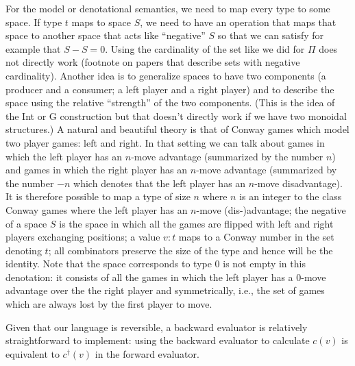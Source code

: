 \documentclass[authoryear,preprint]{sigplanconf}
\begin{document}
For the model or denotational semantics, we need to map every type to some
space. If type $t$ maps to space $S$, we need to have an operation that maps
that space to another space that acts like ``negative'' $S$ so that we can
satisfy for example that $S-S=0$. Using the cardinality of the set like we
did for $\Pi$ does not directly work (footnote on papers that describe sets
with negative cardinality). Another idea is to generalize spaces to have two
components (a producer and a consumer; a left player and a right player) and
to describe the space using the relative ``strength'' of the two
components. (This is the idea of the Int or G construction but that doesn't
directly work if we have two monoidal structures.) A natural and beautiful
theory is that of Conway games which model two player games: left and
right. In that setting we can talk about games in which the left player has
an $n$-move advantage (summarized by the number $n$) and games in which the
right player has an $n$-move advantage (summarized by the number $-n$ which
denotes that the left player has an $n$-move disadvantage). It is therefore
possible to map a type of size $n$ where $n$ is an integer to the class
Conway games where the left player has an $n$-move (dis-)advantage; the
negative of a space $S$ is the space in which all the games are flipped with
left and right players exchanging positions; a value $v : t$ maps to a Conway
number in the set denoting $t$; all combinators preserve the size of the type
and hence will be the identity. Note that the space corresponds to type $0$
is not empty in this denotation: it consists of all the games in which the
left player has a $0$-move advantage over the the right player and
symmetrically, i.e., the set of games which are always lost by the first
player to move.

Given that our language is reversible, a backward evaluator is relatively
straightforward to implement: using the backward evaluator to calculate
$c(v)$ is equivalent to $c^{\dagger}(v)$ in the forward evaluator.
\end{document}
